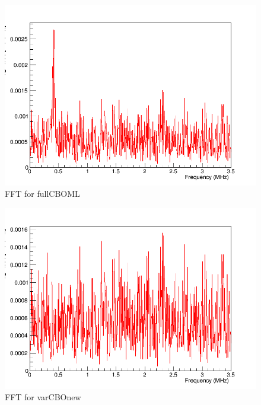 \begin{figure}[ht]
\centering 
\includegraphics[scale=0.5]{Figures/fullCBOML_fft.png}
\decoRule
\caption{FFT for fullCBOML}
\label{fig:fullCBOML_fft}
\end{figure}
\fi

\begin{figure}[ht]
\centering 
\includegraphics[scale=0.5]{Figures/varCBOnew_fft.png}
\decoRule
\caption{FFT for varCBOnew}
\label{fig:varCBOnew_fft}
\end{figure}

